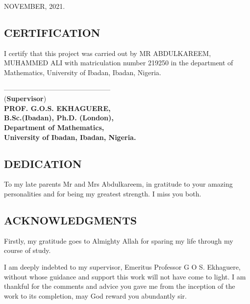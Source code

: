 \documentclass[a4 paper, 12pt]{report}
\theoremstyle{plain}
\begin{document}
\begin{center}
	NOVEMBER, 2021.
\end{center}
\newpage
\begin{center}
	\section*{CERTIFICATION} 
\end{center}
I certify that this project was carried out by  MR ABDULKAREEM, MUHAMMED ALI  with matriculation number 219250 in the department of Mathematics, University of Ibadan, Ibadan, Nigeria.\\
\begin{center}
	-----------------------------------------------\\
	(\textbf{Supervisor})\\
	\textbf{PROF. G.O.S. EKHAGUERE,}\\
	\textbf{B.Sc.(Ibadan), Ph.D. (London),}\\
	\textbf{Department of Mathematics,}\\
	\textbf{University of Ibadan, Ibadan, Nigeria.} 
\end{center}

\newpage
\begin{center}
	\section*{DEDICATION}
\end{center}
\noindent
\par To my late parents Mr and Mrs Abdulkareem, in gratitude to your
amazing personalities and for being my greatest strength. I miss you both.


\newpage
\begin{center}
	\section*{ACKNOWLEDGMENTS}
\end{center}
\par  Firstly, my gratitude goes to Almighty Allah for sparing my life through my
course of study.\\
\par I am deeply indebted to my supervisor, Emeritus Professor G O S. Ekhaguere,
without whose guidance and support this work will not have come to light. I am
thankful for the comments and advice you gave me from the inception of the
work to its completion, may God reward you abundantly sir.\\
\end{document}
